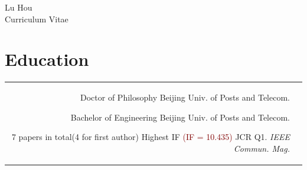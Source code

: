 \documentclass[10pt]{article} %
\newcommand{\IF}[1]{\textcolor{Maroon}{(IF = #1)}}
\begin{document}
\newpage

\begin{paracol}{2} %


\parbox[top][0.12\textheight][c]{\linewidth}{ %
	\vspace{-0.04\textheight} %
	\centering %
	{\Huge\cvtextfont Lu Hou}\hspace{1pt} \\\medskip %
	{\Huge\color{headings}\cvtextfont Curriculum Vitae}
}

\section{Education} 
\begin{supertabular}{rl} %
	
	
	{Doctor of Philosophy} %
	{}%
	{}%
	{Beijing Univ. of Posts and Telecom.} %
	
	
	{Bachelor of Engineering} %
	{}%
	{}%
	{Beijing Univ. of Posts and Telecom.} %
	
	{7 papers in total(4 for first author)}%
	{} %
	{Highest IF \IF{10.435}} %
	{JCR Q1. \textit{IEEE Commun. Mag.}} %
\end{supertabular}


\end{paracol}
\end{document}
